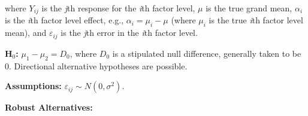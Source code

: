 \documentclass[12pt,english]{article}\usepackage[]{graphicx}\usepackage[table]{xcolor}
\begin{document}
\noindent where $Y_{ij}$ is the \textit{j}th response for the \textit{i}th factor level, $\mu$ is the true grand mean, $\alpha_i$ is the \textit{i}th factor level effect, e.g., $\alpha_i = \mu_i - \mu$ (where $\mu_i$ is the true \textit{i}th factor level mean), and $\varepsilon_{ij}$ is the \textit{j}th error in the \textit{i}th factor level. \\
\vspace{0.05in}

\noindent \textbf{H$_0$:} $\mu_1 - \mu_2 = D_0$, where $D_0$ is a stipulated null difference, generally taken to be 0. Directional alternative hypotheses are possible.

\vspace{0.1in}
\noindent \textbf{Assumptions:} 
$\varepsilon_{ij} \sim N(0, \sigma^2)$.
\vspace{0.1in}

\noindent \textbf{Robust Alternatives:}
\end{document}
